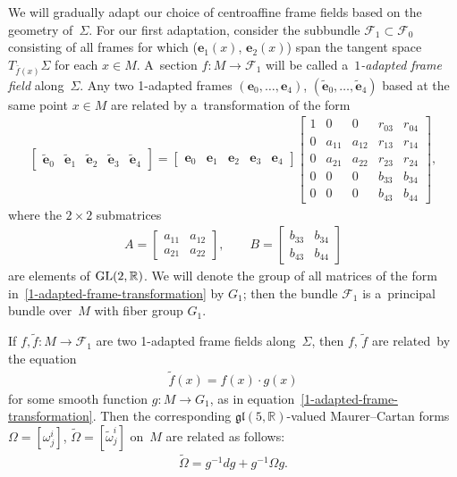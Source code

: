 \documentclass[pdftex]{sigma}
\numberwithin{equation}{section}
\theoremstyle{definition}
\begin{document}
We will gradually adapt our choice of centroaf\/f\/ine frame f\/ields based on the geometry of~$\Sigma$.
For our f\/irst adaptation, consider the subbundle $\mathcal{F}_1 \subset \mathcal{F}_0$ consisting of all frames for
which ($\mathbf{e}_1(x)$, $\mathbf{e}_2(x)$) span the tangent space $T_{\bar{f}(x)}\Sigma$ for each $x \in M$.
A~section $f:M \to \mathcal{F}_1$ will be called a~{\em $1$-adapted frame field} along~$\Sigma$.
Any two 1-adapted frames $(\mathbf{e}_0, \ldots, \mathbf{e}_4)$, $(\tilde{\mathbf{e}}_0, \ldots, \tilde{\mathbf{e}}_4)$
based at the same point $x \in M$ are related by a~transformation of the form
\begin{gather}
\begin{bmatrix}
\tilde{\mathbf{e}}_0 & \tilde{\mathbf{e}}_1 & \tilde{\mathbf{e}}_2 & \tilde{\mathbf{e}}_3 & \tilde{\mathbf{e}}_4
\end{bmatrix}
=
\begin{bmatrix}
\mathbf{e}_0 & \mathbf{e}_1 & \mathbf{e}_2 & \mathbf{e}_3 & \mathbf{e}_4
\end{bmatrix}
\begin{bmatrix}
1 & 0 & 0 & r_{03} & r_{04}
\\
0 & a_{11} & a_{12} & r_{13} & r_{14}
\\
0 & a_{21} & a_{22} & r_{23} & r_{24}
\\
0 & 0 & 0 & b_{33} & b_{34}
\\
0 & 0 & 0 & b_{43} & b_{44}
\end{bmatrix},
\label{1-adapted-frame-transformation}
\end{gather}
where the $2\times 2$ submatrices
\begin{gather*}
A =
\begin{bmatrix}
a_{11} & a_{12}
\\
a_{21} & a_{22}
\end{bmatrix},
\qquad
B =
\begin{bmatrix}
b_{33} & b_{34}
\\
b_{43} & b_{44}
\end{bmatrix}
\end{gather*}
are elements of ${\rm GL}(2, \mathbb{R})$.
We will denote the group of all matrices of the form in~\eqref{1-adapted-frame-transformation} by $G_1$; then the bundle
$\mathcal{F}_1$ is a~principal bundle over~$M$ with f\/iber group $G_1$.

If $f, \tilde{f}:M \to \mathcal{F}_1$ are two 1-adapted frame f\/ields along~$\Sigma$, then $f$, $\tilde{f}$ are related~by
the equation
\begin{gather*}
\tilde{f}(x) = f(x) \cdot g(x)
\end{gather*}
for some smooth function $g:M \to G_1$, as in equation~\eqref{1-adapted-frame-transformation}.
Then the corresponding $\mathfrak{gl}(5, \mathbb{R})$-valued Maurer--Cartan forms $\Omega = [\omega^i_j]$,
$\tilde{\Omega} = [\tilde{\omega}^i_j]$ on~$M$ are related as follows:
\begin{gather}
\tilde{\Omega} = g^{-1} dg + g^{-1} \Omega g.
\label{how-MC-forms-transform}
\end{gather}
\end{document}
